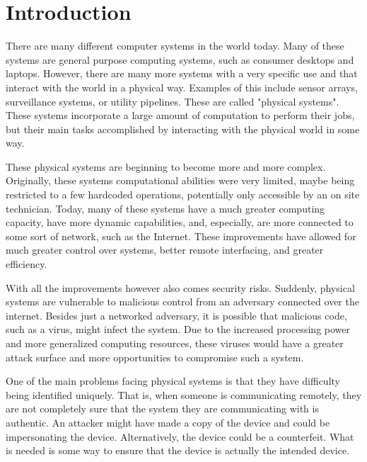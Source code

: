 %
%
%

\chapter{Introduction}
\label{chapter:intro}

There are many different computer systems in the world today. Many of these systems are general purpose computing
systems, such as consumer desktops and laptops. However, there are many more systems with a very specific use
and that interact with the world in a physical way. Examples of this include sensor arrays, surveillance systems,
or utility pipelines. These are called "physical systems".
These systems incorporate a large amount of computation to perform their jobs, but their main tasks accomplished
by interacting with the physical world in some way. 

These physical systems are beginning to become more and more complex. Originally, these systems computational
abilities were very limited, maybe being restricted to a few hardcoded operations, potentially only accessible by
an on site technician. Today, many of these systems have a much greater computing capacity, have more
dynamic capabilities, and, especially, are more connected to some sort of network, such as the Internet.
These improvements have allowed for much greater control over systems, better remote interfacing, and greater
efficiency.

With all the improvements however also comes security risks. Suddenly, physical systems are vulnerable to malicious
control from an adversary connected over the internet. Besides just a networked adversary, it is possible that
malicious code, such as a virus, might infect the system. Due to the increased processing power and more 
generalized computing resources, these viruses would have a greater attack surface and more opportunities to
compromise such a system.

One of the main problems facing physical systems is that they have difficulty being identified uniquely. That is,
when someone is communicating remotely, they  are not completely sure that the system they are communicating
with is authentic. An attacker might have made a copy of the device and could be impersonating the device. 
Alternatively, the device could be a counterfeit. 
What is needed is some way to ensure that the device is actually the intended device.

